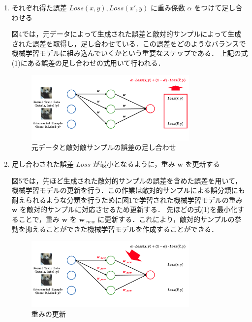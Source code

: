 \begin{enumerate}
    \item それぞれ得た誤差 $Loss(x, y), Loss(x', y)$ に重み係数 $\alpha$ をつけて足し合わせる

    図4では，元データによって生成された誤差と敵対的サンプルによって生成された誤差を取得し，足し合わせている．この誤差をどのようなバランスで機械学習モデルに組み込んでいくかという重要なステップである． 上記の式(1)にある誤差の足し合わせの式用いて行われる．
    
    \begin{figure}[H]
        \centering
        \includegraphics[width=0.8\textwidth]{images/敵対的学習3.png}
        \caption{元データと敵対敵サンプルの誤差の足し合わせ}
        \label{fig:adversarial_learning3}
    \end{figure}

    \item 足し合わされた誤差 $Loss$ が最小となるように，重み $\bm{w}$ を更新する

    図5では，先ほど生成された敵対的サンプルの誤差を含めた誤差を用いて，機械学習モデルの更新を行う．この作業は敵対的サンプルによる誤分類にも耐えられるような分類を行うために図1で学習された機械学習モデルの重み $\bm{w}$ を敵対的サンプルに対応させるため更新する．
    先ほどの式(1)を最小化することで，重み $\bm{w}$ を $\bm{w}_{\_new}$ に更新する．これにより，敵対的サンプルの挙動を抑えることができた機械学習モデルを作成することができる．
    
    \begin{figure}[H]
        \centering
        \includegraphics[width=0.8\textwidth]{images/敵対的学習4.png}
        \caption{重みの更新}
        \label{fig:adversarial_learning4}
    \end{figure}

\end{enumerate}

